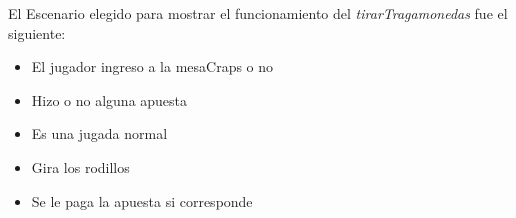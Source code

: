 % 
% 


El Escenario elegido para mostrar el funcionamiento del \textit{tirarTragamonedas} fue el siguiente:

 \escenario
 {
\begin{itemize}
  \item El jugador ingreso a la mesaCraps o no
  \item Hizo o no alguna apuesta
  \item Es una jugada normal
  \item Gira los rodillos
  \item Se le paga la apuesta si corresponde
\end{itemize}

}
